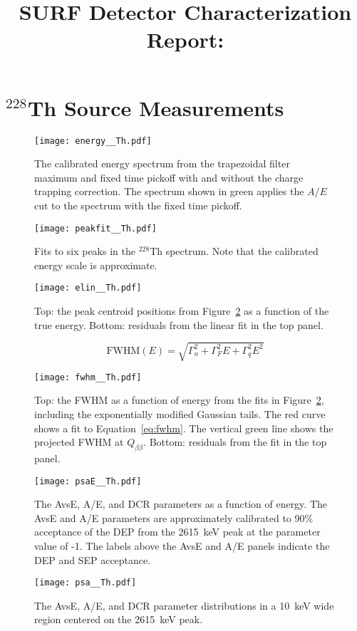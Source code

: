 \documentclass[12pt]{article}
\begin{document}
\title{SURF Detector Characterization Report:}
\author{}
\maketitle

\section{$^{228}$Th Source Measurements}

\begin{figure}[!htb]
  \centering
  \texttt{[image: energy\_\_Th.pdf]}
  \caption{The calibrated energy spectrum from the trapezoidal filter maximum and fixed time pickoff with and without the charge trapping correction.  The spectrum shown in green applies the $A/E$ cut to the spectrum with the fixed time pickoff.\label{fig:energy_Th}}
\end{figure}

\begin{figure}[!htb]
  \centering
  \texttt{[image: peakfit\_\_Th.pdf]}
  \caption{Fits to six peaks in the $^{228}$Th spectrum.  Note that the calibrated energy scale is approximate.\label{fig:peakfit_Th}}
\end{figure}

\begin{figure}[!htb]
  \centering
  \texttt{[image: elin\_\_Th.pdf]}
  \caption{Top: the peak centroid positions from Figure~\ref{fig:peakfit_Th} as a function of the true energy.  Bottom: residuals from the linear fit in the top panel.\label{fig:elin_Th}}
\end{figure}

\begin{equation}
  \label{eq:fwhm}
  \text{FWHM}(E) = \sqrt{\Gamma^2_n+\Gamma^2_FE+\Gamma^2_qE^2}
\end{equation}

\begin{figure}[!htb]
  \centering
  \texttt{[image: fwhm\_\_Th.pdf]}
  \caption{Top: the FWHM as a function of energy from the fits in Figure~\ref{fig:peakfit_Th}, including the exponentially modified Gaussian tails.  The red curve shows a fit to Equation~\ref{eq:fwhm}.  The vertical green line shows the projected FWHM at $Q_{\beta\beta}$.  Bottom: residuals from the fit in the top panel.\label{fig:fwhm_Th}}
\end{figure}

\begin{figure}[!htb]
  \centering
  \texttt{[image: psaE\_\_Th.pdf]}
  \caption{The AvsE, A/E, and DCR parameters as a function of energy.  The AvsE and A/E parameters are approximately calibrated to 90\% acceptance of the DEP from the 2615~keV peak at the parameter value of -1.  The labels above the AvsE and A/E panels indicate the DEP and SEP acceptance.\label{fig:psaE_Th}}
\end{figure}

\begin{figure}[!htb]
  \centering
  \texttt{[image: psa\_\_Th.pdf]}
  \caption{The AvsE, A/E, and DCR parameter distributions in a 10~keV wide region centered on the 2615~keV peak.\label{fig:psa_Th}}
\end{figure}
\end{document}
